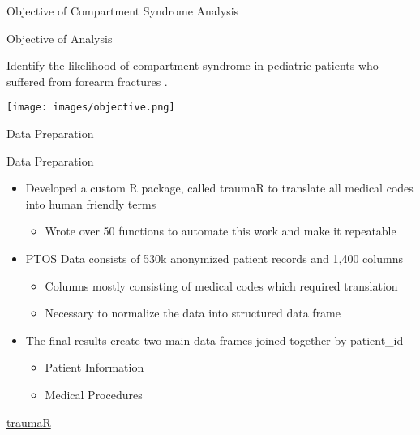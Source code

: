 \documentclass[
  ignorenonframetext,
]{beamer}
\providecommand{\tightlist}{%
  \setlength{\itemsep}{0pt}\setlength{\parskip}{0pt}}
\begin{document}
\begin{frame}{ Objective of Compartment Syndrome Analysis }
\protect\hypertarget{objective-of-compartment-syndrome-analysis}{}

\begin{block}{Objective of Analysis}

Identify the likelihood of compartment syndrome in pediatric patients
who suffered from forearm fractures .

\texttt{[image: images/objective.png]}

\end{block}

\end{frame}

\begin{frame}{Data Preparation}
\protect\hypertarget{data-preparation}{}

\begin{block}{Data Preparation}

\begin{itemize}
\tightlist
\item
  Developed a custom R package, called traumaR to translate all medical
  codes into human friendly terms

  \begin{itemize}
  \tightlist
  \item
    Wrote over 50 functions to automate this work and make it repeatable
  \end{itemize}
\item
  PTOS Data consists of 530k anonymized patient records and 1,400
  columns

  \begin{itemize}
  \tightlist
  \item
    Columns mostly consisting of medical codes which required
    translation
  \item
    Necessary to normalize the data into structured data frame
  \end{itemize}
\item
  The final results create two main data frames joined together by
  patient\_id

  \begin{itemize}
  \tightlist
  \item
    Patient Information
  \item
    Medical Procedures
  \end{itemize}
\end{itemize}

\href{https://github.com/mjkarlsen/traumaR}{traumaR}

\end{block}

\end{frame}
\end{document}
